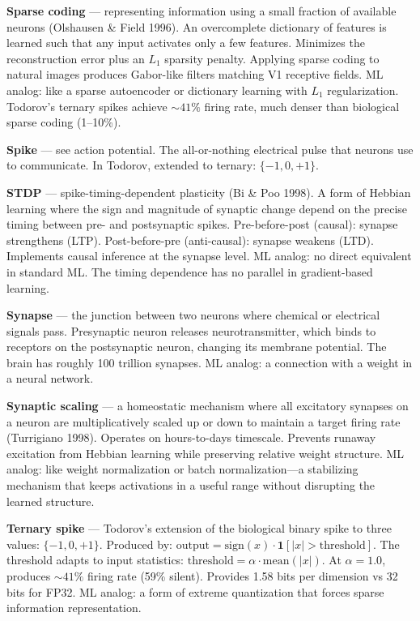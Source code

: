 \documentclass[11pt,a4paper]{article}
\begin{document}
\textbf{Sparse coding} --- representing information using a small fraction of available neurons (Olshausen \& Field 1996). An overcomplete dictionary of features is learned such that any input activates only a few features. Minimizes the reconstruction error plus an $L_1$ sparsity penalty. Applying sparse coding to natural images produces Gabor-like filters matching V1 receptive fields. ML analog: like a sparse autoencoder or dictionary learning with $L_1$ regularization. Todorov's ternary spikes achieve ${\sim}41\%$ firing rate, much denser than biological sparse coding (1--10\%).

\textbf{Spike} --- see action potential. The all-or-nothing electrical pulse that neurons use to communicate. In Todorov, extended to ternary: $\{-1, 0, +1\}$.

\textbf{STDP} --- spike-timing-dependent plasticity (Bi \& Poo 1998). A form of Hebbian learning where the sign and magnitude of synaptic change depend on the precise timing between pre- and postsynaptic spikes. Pre-before-post (causal): synapse strengthens (LTP). Post-before-pre (anti-causal): synapse weakens (LTD). Implements causal inference at the synapse level. ML analog: no direct equivalent in standard ML. The timing dependence has no parallel in gradient-based learning.

\textbf{Synapse} --- the junction between two neurons where chemical or electrical signals pass. Presynaptic neuron releases neurotransmitter, which binds to receptors on the postsynaptic neuron, changing its membrane potential. The brain has roughly 100 trillion synapses. ML analog: a connection with a weight in a neural network.

\textbf{Synaptic scaling} --- a homeostatic mechanism where all excitatory synapses on a neuron are multiplicatively scaled up or down to maintain a target firing rate (Turrigiano 1998). Operates on hours-to-days timescale. Prevents runaway excitation from Hebbian learning while preserving relative weight structure. ML analog: like weight normalization or batch normalization---a stabilizing mechanism that keeps activations in a useful range without disrupting the learned structure.

\textbf{Ternary spike} --- Todorov's extension of the biological binary spike to three values: $\{-1, 0, +1\}$. Produced by: $\mathrm{output} = \mathrm{sign}(x) \cdot \mathbf{1}[|x| > \mathrm{threshold}]$. The threshold adapts to input statistics: $\mathrm{threshold} = \alpha \cdot \mathrm{mean}(|x|)$. At $\alpha = 1.0$, produces ${\sim}41\%$ firing rate (59\% silent). Provides 1.58 bits per dimension vs 32 bits for FP32. ML analog: a form of extreme quantization that forces sparse information representation.
\end{document}
